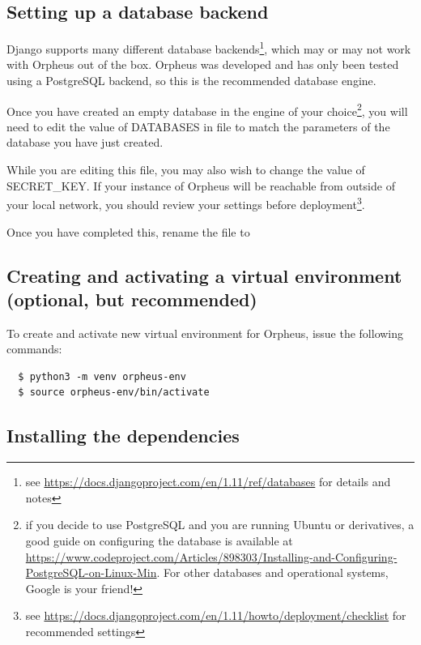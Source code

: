 \documentclass[british, 12pt]{article}
\begin{document}
\subsection{Setting up a database backend}

Django supports many different database backends\footnote{see \url{https://docs.djangoproject.com/en/1.11/ref/databases} for details and notes}, which may or may not work with Orpheus out of the box. Orpheus was developed and has only been tested using a PostgreSQL backend, so this is the recommended database engine.

Once you have created an empty database in the engine of your choice\footnote{if you decide to use PostgreSQL and you are running Ubuntu or derivatives, a good guide on configuring the database is available at \url{https://www.codeproject.com/Articles/898303/Installing-and-Configuring-PostgreSQL-on-Linux-Min}. For other databases and operational systems, Google is your friend!}, you will need to edit the value of \mbox{DATABASES} in file  to match the parameters of the database you have just created.

While you are editing this file, you may also wish to change the value of \mbox{SECRET\_KEY}. If your instance of Orpheus will be reachable from outside of your local network, you should review your settings before deployment\footnote{see \url{https://docs.djangoproject.com/en/1.11/howto/deployment/checklist} for recommended settings}.

Once you have completed this, rename the file  to 

\subsection{Creating and activating a virtual environment (optional, but recommended)}

To create and activate new virtual environment for Orpheus, issue the following commands:

\begin{lstlisting}
  $ python3 -m venv orpheus-env
  $ source orpheus-env/bin/activate
\end{lstlisting}

\subsection{Installing the dependencies}
\end{document}
